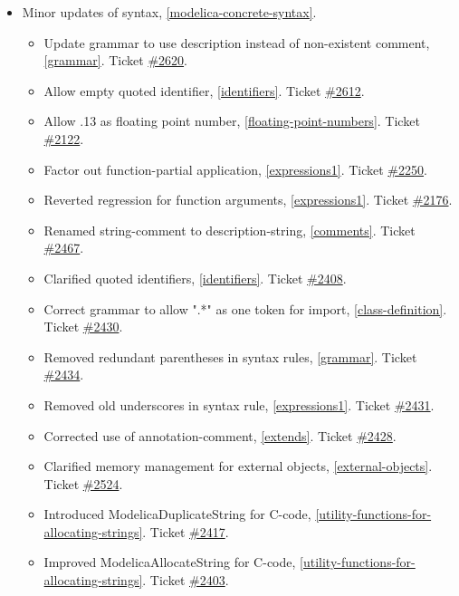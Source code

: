 \begin{itemize}
\item Minor updates of syntax, \cref{modelica-concrete-syntax}.
\begin{itemize}
\item Update grammar to use description instead of non-existent comment, \cref{grammar}.
Ticket \href{https://github.com/modelica/ModelicaSpecification/pull/2620}{\#2620}.
\item Allow empty quoted identifier, \cref{identifiers}.
Ticket \href{https://github.com/modelica/ModelicaSpecification/issues/2612}{\#2612}.
\item Allow .13 as floating point number, \cref{floating-point-numbers}.
Ticket \href{https://github.com/modelica/ModelicaSpecification/issues/2122}{\#2122}.
\item Factor out function-partial application, \cref{expressions1}.
Ticket \href{https://github.com/modelica/ModelicaSpecification/issues/2250}{\#2250}.
\item Reverted regression for function arguments, \cref{expressions1}.
Ticket \href{https://github.com/modelica/ModelicaSpecification/issues/2176}{\#2176}.
\item Renamed string-comment to description-string, \cref{comments}.
Ticket \href{https://github.com/modelica/ModelicaSpecification/pull/2467}{\#2467}.
\item Clarified quoted identifiers, \cref{identifiers}.
Ticket \href{https://github.com/modelica/ModelicaSpecification/issues/2408}{\#2408}.
\item Correct grammar to allow ".*" as one token for import, \cref{class-definition}.
Ticket \href{https://github.com/modelica/ModelicaSpecification/issues/2430}{\#2430}.
\item Removed redundant parentheses in syntax rules, \cref{grammar}.
Ticket \href{https://github.com/modelica/ModelicaSpecification/issues/2434}{\#2434}.
\item Removed old underscores in syntax rule, \cref{expressions1}.
Ticket \href{https://github.com/modelica/ModelicaSpecification/issues/2431}{\#2431}.
\item Corrected use of annotation-comment, \cref{extends}.
Ticket \href{https://github.com/modelica/ModelicaSpecification/pull/2428}{\#2428}.
\item Clarified memory management for external objects, \cref{external-objects}.
Ticket \href{https://github.com/modelica/ModelicaSpecification/issues/2524}{\#2524}.
\item Introduced ModelicaDuplicateString for C-code, \cref{utility-functions-for-allocating-strings}.
Ticket \href{https://github.com/modelica/ModelicaSpecification/issues/2417}{\#2417}.
\item Improved ModelicaAllocateString for C-code, \cref{utility-functions-for-allocating-strings}.
Ticket \href{https://github.com/modelica/ModelicaSpecification/issues/2403}{\#2403}.
\end{itemize}


\end{itemize}
